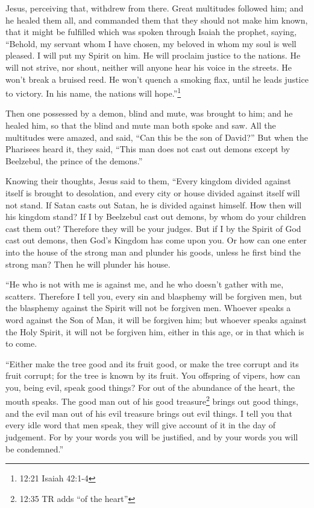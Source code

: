  Jesus, perceiving that, withdrew from there. Great
multitudes followed him; and he healed them all,  and
commanded them that they should not make him known,  that
it might be fulfilled which was spoken through Isaiah the prophet,
saying,  ``Behold, my servant whom I have chosen, my
beloved in whom my soul is well pleased. I will put my Spirit on him. He
will proclaim justice to the nations.  He will not strive,
nor shout, neither will anyone hear his voice in the streets.
 He won't break a bruised reed. He won't quench a smoking
flax, until he leads justice to victory.  In his name, the
nations will hope.''\footnote{12:21 Isaiah 42:1-4}

 Then one possessed by a demon, blind and mute, was brought
to him; and he healed him, so that the blind and mute man both spoke and
saw.  All the multitudes were amazed, and said, ``Can this
be the son of David?''  But when the Pharisees heard it,
they said, ``This man does not cast out demons except by Beelzebul, the
prince of the demons.''

 Knowing their thoughts, Jesus said to them, ``Every
kingdom divided against itself is brought to desolation, and every city
or house divided against itself will not stand.  If Satan
casts out Satan, he is divided against himself. How then will his
kingdom stand?  If I by Beelzebul cast out demons, by whom
do your children cast them out? Therefore they will be your judges.
 But if I by the Spirit of God cast out demons, then God's
Kingdom has come upon you.  Or how can one enter into the
house of the strong man and plunder his goods, unless he first bind the
strong man? Then he will plunder his house.

 ``He who is not with me is against me, and he who doesn't
gather with me, scatters.  Therefore I tell you, every sin
and blasphemy will be forgiven men, but the blasphemy against the Spirit
will not be forgiven men.  Whoever speaks a word against
the Son of Man, it will be forgiven him; but whoever speaks against the
Holy Spirit, it will not be forgiven him, either in this age, or in that
which is to come.

 ``Either make the tree good and its fruit good, or make
the tree corrupt and its fruit corrupt; for the tree is known by its
fruit.  You offspring of vipers, how can you, being evil,
speak good things? For out of the abundance of the heart, the mouth
speaks.  The good man out of his good treasure\footnote{12:35
  TR adds ``of the heart''} brings out good things, and the evil man out
of his evil treasure brings out evil things.  I tell you
that every idle word that men speak, they will give account of it in the
day of judgement.  For by your words you will be justified,
and by your words you will be condemned.''

